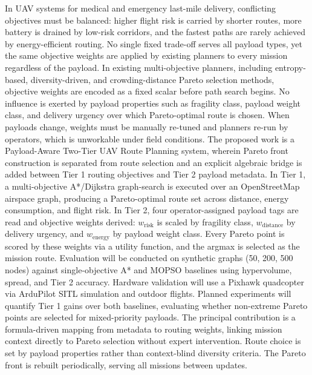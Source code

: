 \documentclass{ssnreview}
\begin{document}
\makereviewtitle
\reviewfrontmatter

\begin{reviewabstract}
In UAV systems for medical and emergency last-mile delivery, conflicting objectives
must be balanced: higher flight risk is carried by shorter routes, more battery is
drained by low-risk corridors, and the fastest paths are rarely achieved by
energy-efficient routing. No single fixed trade-off serves all payload types, yet the
same objective weights are applied by existing planners to every mission regardless of
the payload. In existing multi-objective planners, including entropy-based, diversity-driven, and
crowding-distance Pareto selection methods, objective weights are encoded as a fixed
scalar before path search begins. No influence is exerted by payload properties such as
fragility class, payload weight class, and delivery urgency over which Pareto-optimal
route is chosen. When payloads change, weights must be manually re-tuned and planners
re-run by operators, which is unworkable under field conditions. The proposed work is a Payload-Aware Two-Tier UAV Route Planning system, wherein
Pareto front construction is separated from route selection and an explicit algebraic
bridge is added between Tier 1 routing objectives and Tier 2 payload metadata.
In Tier 1, a multi-objective A*/Dijkstra graph-search is executed over an OpenStreetMap
airspace graph, producing a Pareto-optimal route set across distance, energy
consumption, and flight risk. In Tier 2, four operator-assigned payload tags are read
and objective weights derived: $w_\mathrm{risk}$ is scaled by fragility class,
$w_\mathrm{distance}$ by delivery urgency, and $w_\mathrm{energy}$ by payload weight
class. Every Pareto point is scored by these weights via a utility function, and the
argmax is selected as the mission route. Evaluation will be conducted on synthetic
graphs (50, 200, 500 nodes) against single-objective A* and MOPSO baselines using
hypervolume, spread, and Tier 2 accuracy. Hardware validation will use a Pixhawk
quadcopter via ArduPilot SITL simulation and outdoor flights. Planned experiments will quantify Tier 1 gains over both baselines, evaluating whether
non-extreme Pareto points are selected for mixed-priority payloads. The principal contribution is a formula-driven mapping from metadata to routing weights,
linking mission context directly to Pareto selection without expert intervention. Route
choice is set by payload properties rather than context-blind diversity criteria. The
Pareto front is rebuilt periodically, serving all missions between updates.
\end{reviewabstract}
\end{document}
